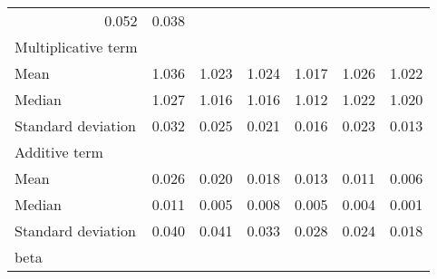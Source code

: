 \begin{tabular}{lllllll}
  \multicolumn{1}{r}{0.052} &
  \multicolumn{1}{r}{0.038} \\
\multicolumn{1}{l}{Multiplicative term} &
  \multicolumn{1}{|r}{} &
  \multicolumn{1}{r}{} &
  \multicolumn{1}{r}{} &
  \multicolumn{1}{r}{} &
  \multicolumn{1}{r}{} &
  \multicolumn{1}{r}{} \\
\multicolumn{1}{l}{\hspace{1em}Mean} &
  \multicolumn{1}{|r}{1.036} &
  \multicolumn{1}{r}{1.023} &
  \multicolumn{1}{r}{1.024} &
  \multicolumn{1}{r}{1.017} &
  \multicolumn{1}{r}{1.026} &
  \multicolumn{1}{r}{1.022} \\
\multicolumn{1}{l}{\hspace{1em}Median} &
  \multicolumn{1}{|r}{1.027} &
  \multicolumn{1}{r}{1.016} &
  \multicolumn{1}{r}{1.016} &
  \multicolumn{1}{r}{1.012} &
  \multicolumn{1}{r}{1.022} &
  \multicolumn{1}{r}{1.020} \\
\multicolumn{1}{l}{\hspace{1em}Standard deviation} &
  \multicolumn{1}{|r}{0.032} &
  \multicolumn{1}{r}{0.025} &
  \multicolumn{1}{r}{0.021} &
  \multicolumn{1}{r}{0.016} &
  \multicolumn{1}{r}{0.023} &
  \multicolumn{1}{r}{0.013} \\
\multicolumn{1}{l}{Additive term} &
  \multicolumn{1}{|r}{} &
  \multicolumn{1}{r}{} &
  \multicolumn{1}{r}{} &
  \multicolumn{1}{r}{} &
  \multicolumn{1}{r}{} &
  \multicolumn{1}{r}{} \\
\multicolumn{1}{l}{\hspace{1em}Mean} &
  \multicolumn{1}{|r}{0.026} &
  \multicolumn{1}{r}{0.020} &
  \multicolumn{1}{r}{0.018} &
  \multicolumn{1}{r}{0.013} &
  \multicolumn{1}{r}{0.011} &
  \multicolumn{1}{r}{0.006} \\
\multicolumn{1}{l}{\hspace{1em}Median} &
  \multicolumn{1}{|r}{0.011} &
  \multicolumn{1}{r}{0.005} &
  \multicolumn{1}{r}{0.008} &
  \multicolumn{1}{r}{0.005} &
  \multicolumn{1}{r}{0.004} &
  \multicolumn{1}{r}{0.001} \\
\multicolumn{1}{l}{\hspace{1em}Standard deviation} &
  \multicolumn{1}{|r}{0.040} &
  \multicolumn{1}{r}{0.041} &
  \multicolumn{1}{r}{0.033} &
  \multicolumn{1}{r}{0.028} &
  \multicolumn{1}{r}{0.024} &
  \multicolumn{1}{r}{0.018} \\
\multicolumn{1}{l}{beta} &
  \multicolumn{1}{|r}{} &
  \multicolumn{1}{r}{} &
  \multicolumn{1}{r}{} &
  \multicolumn{1}{r}{} &
  \multicolumn{1}{r}{} &
  \multicolumn{1}{r}{} \\

\end{tabular}
